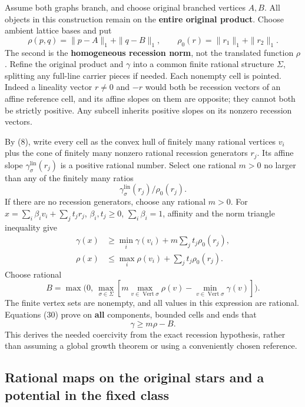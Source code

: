 \documentclass[
  11pt,
]{article}
\begin{document}
Assume both graphs branch, and choose original branched vertices
\(A,B\). All objects in this construction remain on the \textbf{entire
original product}. Choose ambient lattice bases and put \[
\rho(p,q)=\|p-A\|_1+\|q-B\|_1,\qquad
\rho_0(r)=\|r_1\|_1+\|r_2\|_1.                               \tag{28}
\] The second is the \textbf{homogeneous recession norm}, not the
translated function \(\rho\). Refine the original product and \(\gamma\)
into a common finite rational structure \(\Sigma\), splitting any
full-line carrier pieces if needed. Each nonempty cell is pointed.
Indeed a lineality vector \(r\ne0\) and \(-r\) would both be recession
vectors of an affine reference cell, and its affine slopes on them are
opposite; they cannot both be strictly positive. Any subcell inherits
positive slopes on its nonzero recession vectors.

By (8), write every cell as the convex hull of finitely many rational
vertices \(v_i\) plus the cone of finitely many nonzero rational
recession generators \(r_j\). Its affine slope
\(\gamma_\sigma^{\mathrm{lin}}(r_j)\) is a positive rational number.
Select one rational \(m>0\) no larger than any of the finitely many
ratios \[
       \gamma_\sigma^{\mathrm{lin}}(r_j)/\rho_0(r_j).            \tag{29}
\] If there are no recession generators, choose any rational \(m>0\).
For \(x=\sum_i\beta_iv_i+\sum_jt_jr_j\), \(\beta_i,t_j\geq0\),
\(\sum_i\beta_i=1\), affinity and the norm triangle inequality give \[
\begin{split}
\gamma(x)&\geq\min_i\gamma(v_i)+m\sum_jt_j\rho_0(r_j),\\
\rho(x)&\leq\max_i\rho(v_i)+\sum_jt_j\rho_0(r_j).
\end{split}                                                        \tag{30}
\] Choose rational \[
B=\max\bigl(0,\ \max_{\sigma\in\Sigma}
                 [m\max_{v\in\operatorname{Vert}\sigma}\rho(v)
                        -\min_{v\in\operatorname{Vert}\sigma}\gamma(v)]\bigr).
\] The finite vertex sets are nonempty, and all values in this
expression are rational. Equations (30) prove on \textbf{all}
components, bounded cells and ends that \[
                         \gamma\geq m\rho-B.                 \tag{31}
\] This derives the needed coercivity from the exact recession
hypothesis, rather than assuming a global growth theorem or using a
conveniently chosen reference.

\subsection{Rational maps on the original stars and a potential in the
fixed
class}\label{rational-maps-on-the-original-stars-and-a-potential-in-the-fixed-class}
\end{document}
